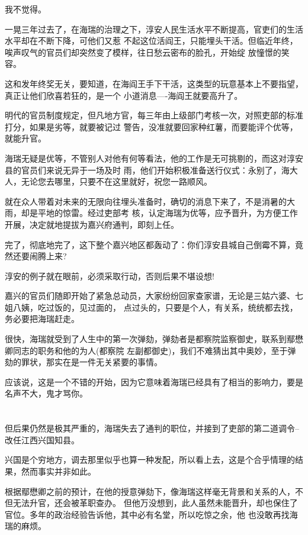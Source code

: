 \documentclass[11pt,a4paper,onecolumn]{article}
\begin{document}
我不觉得。

一晃三年过去了，在海瑞的治理之下，淳安人民生活水平不断提高，官吏们的生活水平却在不断下降，可他们又惹
不起这位活阎王，只能埋头干活。但临近年终，唉声叹气的官员们却突然变了模样，往日愁云密布的脸孔，开始绽
放憧憬的笑容。

这和发年终奖无关，要知道，在海阎王手下干活，这类型的玩意基本上不要指望，真正让他们欣喜若狂的，是一个
小道消息----海阎王就要高升了。

明代的官员制度规定，但凡地方官，每三年由上级部门考核一次，对照吏部的标准打分，如果是劣等，就要被记过
警告，没准就要回家种红薯，而要能评个优等，就能升官。

海瑞无疑是优等，不管别人对他有何等看法，他的工作是无可挑剔的，而这对淳安县的官员们来说无异于一场及时
雨，他们开始积极准备送行仪式：永别了，海大人，无论您去哪里，只要不在这里就好，祝您一路顺风。

就在众人带着对未来的无限向往埋头准备时，确切的消息下来了，不是消暑的大雨，却是平地的惊雷。经过吏部考
核，认定海瑞为优等，应予晋升，为方便工作开展，决定就地提拔为嘉兴府通判，即刻上任。

完了，彻底地完了，这下整个嘉兴地区都轰动了：你们淳安县城自己倒霉不算，竟然还要闹腾上来?

淳安的例子就在眼前，必须采取行动，否则后果不堪设想!

嘉兴的官员们随即开始了紧急总动员，大家纷纷回家查家谱，无论是三姑六婆、七姐八姨，吃过饭的，见过面的，
点过头的，只要是个人，有关系，统统都去找，务必要把海瑞赶走。

很快，海瑞就受到了人生中的第一次弹劾，弹劾者是都察院监察御史，联系到鄢懋卿同志的职务和他的为人(都察院
左副都御史)，我们不难猜出其中奥妙，至于弹劾的罪状，那实在是一件无关紧要的事情。

应该说，这是一个不错的开始，因为它意味着海瑞已经具有了相当的影响力，要是名声不大，鬼才骂你。

\section[\thesection]{}

但后果仍然是极其严重的，海瑞失去了通判的职位，并接到了吏部的第二道调令--改任江西兴国知县。

兴国是个穷地方，调去那里似乎也算一种发配，所以看上去，这是个合乎情理的结果，然而事实并非如此。

根据鄢懋卿之前的预计，在他的授意弹劾下，像海瑞这样毫无背景和关系的人，不但无法升官，还会被革职查办。
但他万没想到，此人虽然未能晋升，却也保住了官位。多年的政治经验告诉他，其中必有名堂，所以吃惊之余，他
也没敢再找海瑞的麻烦。
\end{document}

